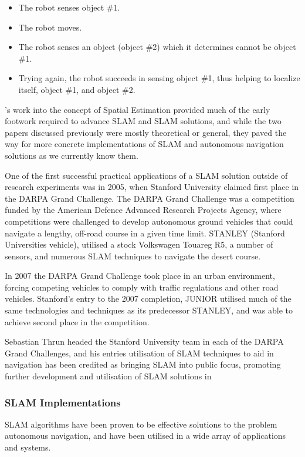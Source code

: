 \begin{itemize}
    \item The robot senses object \#1.
    \item The robot moves. 
    \item The robot senses an object (object \#2) which it determines cannot be
    object \#1.
    \item Trying again, the robot succeeds in sensing object \#1, thus helping
    to localize itself, object \#1, and object \#2.
\end{itemize}

\citeauthor*{Smith1988}'s work into the concept of Spatial Estimation
provided much of the early footwork required to advance SLAM and SLAM
solutions, and while the two papers discussed previously were mostly
theoretical or general, they paved the way for more concrete implementations
of SLAM and autonomous navigation solutions as we currently know them.

One of the first successful practical applications of a SLAM solution outside of
research experiments was in 2005, when Stanford University claimed first
place in the DARPA Grand Challenge.
The DARPA Grand Challenge was a competition funded by the American Defence
Advanced Research Projects Agency, where competitions were challenged to
develop autonomous ground vehicles that could navigate a lengthy, off-road
course in a given time limit. 
STANLEY (Stanford Universities vehicle), utilised a stock Volkswagen
Touareg R5, a number of sensors, and numerous SLAM techniques to navigate the
desert course.

In 2007 the DARPA Grand Challenge took place in an urban environment, forcing
competing vehicles to comply with traffic regulations and other road vehicles.
Stanford's entry to the 2007 completion, JUNIOR utilised much of the same
technologies and techniques as its predecessor STANLEY, and was able to achieve
second place in the competition.

Sebastian Thrun \cite{sebastian} headed the Stanford University team in each
of the DARPA Grand Challenges, and his entries utilisation of SLAM techniques
to aid in navigation \cite{Thrun2006} has been credited as bringing SLAM into
public focus, promoting further development and utilisation of SLAM solutions
in

\subsubsection{SLAM Implementations}
SLAM algorithms have been proven to be effective solutions to the problem
autonomous navigation, and have been utilised in a wide array of applications
and systems.

